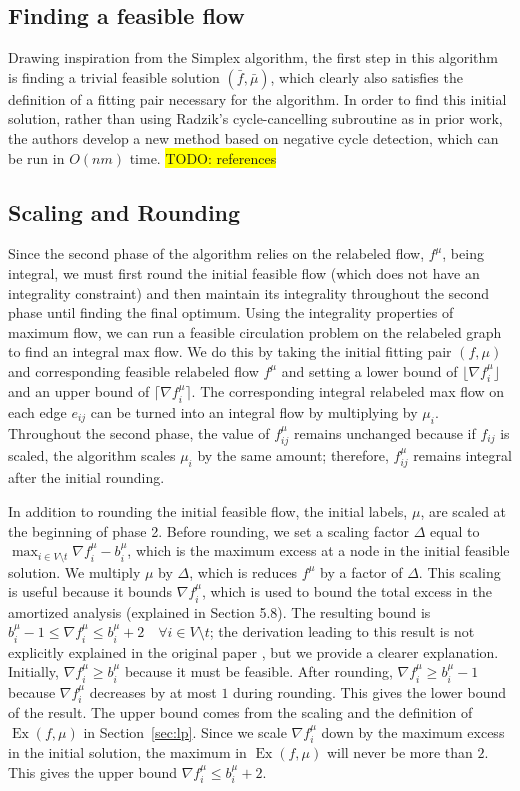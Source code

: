 \documentclass[11pt]{article}
\theoremstyle{definition}
\theoremstyle{definition}
\newcommand{\fu}{f^{\mu}}
\newcommand{\nfiu}{\nabla \fu_i}
\newcommand{\biu}{b_{i}^{\mu}}
\DeclareMathOperator{\Ex}{Ex}
\newcommand{\todo}[1]{\colorbox{yellow}{TODO: #1}}
\begin{document}

    \subsection{Finding a feasible flow}
Drawing inspiration from the Simplex algorithm, the first step in this algorithm is finding a trivial feasible solution $(\bar{f}, \bar{\mu})$, which clearly also satisfies the definition of a fitting pair necessary for the algorithm. In order to find this initial solution, rather than using Radzik's cycle-cancelling subroutine as in prior work, the authors develop a new method based on negative cycle detection, which can be run in $O(nm)$ time. \todo{references} 
    
    \subsection{Scaling and Rounding} 
    Since the second phase of the algorithm relies on the relabeled flow, $f^\mu$, being integral, we must first round the initial feasible flow (which does not have an integrality constraint) and then maintain its integrality throughout the second phase until finding the final optimum. Using the integrality properties of maximum flow, we can run a feasible circulation problem on the relabeled graph to find an integral max flow. We do this by taking the initial fitting pair $(f, \mu)$ and corresponding feasible relabeled flow $f^\mu$ and setting a lower bound of $\lfloor \nabla f_i^\mu \rfloor$ and an upper bound of $\lceil \nabla f_i^\mu \rceil$. The corresponding integral relabeled max flow on each edge $e_{ij}$ can be turned into an integral flow by multiplying by $\mu_i$. Throughout the second phase, the value of $f_{ij}^\mu$ remains unchanged because if $f_{ij}$ is scaled, the algorithm scales $\mu_i$ by the same amount; therefore, $f_{ij}^\mu$ remains integral after the initial rounding.
    
    In addition to rounding the initial feasible flow, the initial labels, $\mu$, are scaled at the beginning of phase 2. Before rounding, we set a scaling factor $\Delta$ equal to $\max_{i \in V \setminus t} \nfiu - \biu$, which is the maximum excess at a node in the initial feasible solution. We multiply $\mu$ by $\Delta$, which is reduces $f^\mu$ by a factor of $\Delta$. This scaling is useful because it bounds $\nfiu$, which is used to bound the total excess in the amortized analysis (explained in Section 5.8). The resulting bound is $\biu - 1 \leq \nfiu \leq \biu + 2 \quad \forall i \in V \setminus t $; the derivation leading to this result is not explicitly explained in the original paper \cite{Olver2017}, but we provide a clearer explanation. Initially, $\nfiu \geq \biu$ because it must be feasible. After rounding, $\nfiu \geq \biu - 1$ because $\nfiu$ decreases by at most $1$ during rounding. This gives the lower bound of the result. The upper bound comes from the scaling and the definition of $\Ex(f, \mu)$ in Section~\ref{sec:lp}. Since we scale $\nfiu$ down by the maximum excess in the initial solution, the maximum in $\Ex(f,\mu)$ will never be more than $2$. This gives the upper bound $\nfiu \leq \biu + 2$. 
\end{document}
